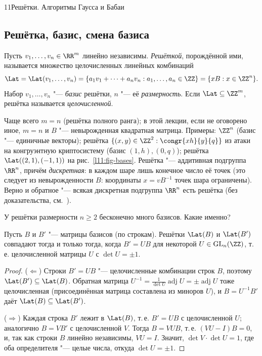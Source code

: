 \begin{lecture}{11}{Решётки. Алгоритмы Гаусса и Бабаи}
\subsection{Решётка, базис, смена базиса}

\begin{definition}
Пусть $v_1, \dots, v_n \in \RR^m$ линейно независимы. \emph{Решёткой}, порождённой ими, называется
множество целочисленных линейных комбинаций
\[
  \Lat = \Lat(v_1, \dots, v_n) = \{a_1 v_1 + \cdots + a_n v_n : a_1, \dots, a_n \in \ZZ\}
  = \{xB : x \in \ZZ^n\}.
\]
Набор $v_1, \dots, v_n$ "--- \emph{базис} решётки, $n$ "--- её \emph{размерность}. Если
$\Lat \subseteq \ZZ^m$, решётка называется \emph{целочисленной}.
\end{definition}

Чаще всего $m = n$ (решётка полного ранга); в этой лекции, если не оговорено иное, $m = n$ и
$B$ "--- невырожденная квадратная матрица. Примеры: $\ZZ^n$ (базис "--- единичные векторы);
решётка $\{(x, y) \in \ZZ^2 : \congr{xh}{y}{q}\}$ из атаки на конгруэнтную криптосистему
(базис $(1, h), (0, q)$); решётка $\Lat((2, 1), (-1, 1))$ на рис.~\ref{l11:fig-bases}.
Решётка "--- аддитивная подгруппа $\RR^n$, причём \emph{дискретная}: в каждом шаре лишь
конечное число её точек (это следует из невырожденности $B$: координаты $x = vB^{-1}$ точек
шара ограничены). Верно и обратное "--- всякая дискретная подгруппа $\RR^n$ есть решётка
(без доказательства, см.~\cite[гл.~16]{galbraith}).

У решётки размерности $n \ge 2$ бесконечно много базисов. Какие именно?

\begin{theorem}\label{l11:basis-change}
Пусть $B$ и $B'$ "--- матрицы базисов (по строкам). Решётки $\Lat(B)$ и $\Lat(B')$ совпадают тогда
и только тогда, когда $B' = UB$ для некоторой $U \in \mathrm{GL}_n(\ZZ)$, т.\,е. целочисленной
матрицы $U$ с $\det U = \pm 1$.
\end{theorem}

\begin{proof}
($\Leftarrow$) Строки $B' = UB$ "--- целочисленные комбинации строк $B$, поэтому
$\Lat(B') \subseteq \Lat(B)$. Обратная матрица $U^{-1} = \frac{1}{\det U}\operatorname{adj} U =
\pm \operatorname{adj} U$ тоже целочисленная (присоединённая матрица составлена из миноров
$U$), и $B = U^{-1} B'$ даёт $\Lat(B) \subseteq \Lat(B')$.

($\Rightarrow$) Каждая строка $B'$ лежит в $\Lat(B)$, т.\,е. $B' = UB$ с целочисленной $U$;
аналогично $B = VB'$ с целочисленной $V$. Тогда $B = VUB$, т.\,е. $(VU - I)B = 0$, и, так как
строки $B$ линейно независимы, $VU = I$. Значит, $\det V \cdot \det U = 1$, где оба
определителя "--- целые числа, откуда $\det U = \pm 1$.
\end{proof}


\end{lecture}
